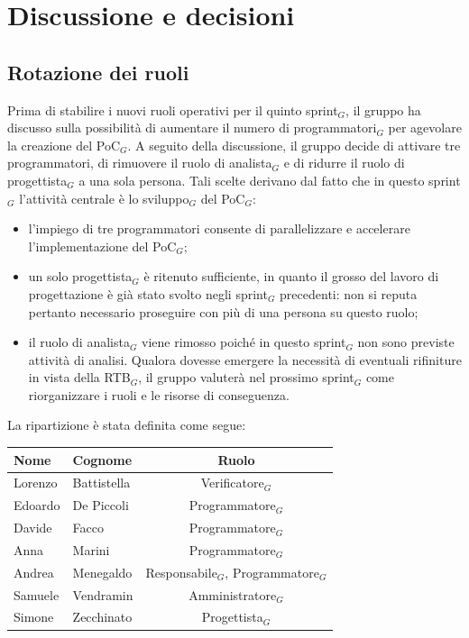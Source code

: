 \documentclass[a4paper, 10pt, colorlinks=true, linkcolor=black, urlcolor=blue, citecolor=blue, hidelinks]{article}
\begin{document}
\section{Discussione e decisioni}

\subsection{Rotazione dei ruoli}
Prima di stabilire i nuovi ruoli operativi per il quinto sprint$_G$, il gruppo ha discusso sulla possibilità di aumentare il numero di programmatori$_G$ per agevolare la creazione del PoC$_G$.
A seguito della discussione, il gruppo decide di attivare tre programmatori, di rimuovere il ruolo di analista$_G$ e di ridurre il ruolo di progettista$_G$ a una sola persona. Tali scelte derivano dal fatto che in questo sprint$_G$ l'attività centrale è lo sviluppo$_G$ del PoC$_G$:
\begin{itemize}
    \item l'impiego di tre programmatori consente di parallelizzare e accelerare l'implementazione del PoC$_G$;
    \item un solo progettista$_G$ è ritenuto sufficiente, in quanto il grosso del lavoro di progettazione è già stato svolto negli sprint$_G$ precedenti: non si reputa pertanto necessario proseguire con più di una persona su questo ruolo;
    \item il ruolo di analista$_G$ viene rimosso poiché in questo sprint$_G$ non sono previste attività di analisi. Qualora dovesse emergere la necessità di eventuali rifiniture in vista della RTB$_G$, il gruppo valuterà nel prossimo sprint$_G$ come riorganizzare i ruoli e le risorse di conseguenza.
\end{itemize}

La ripartizione è stata definita come segue:
\begin{center}
    \begin{tabular}{|l|l|c|}
        \hline
        \textbf{Nome} & \textbf{Cognome} & \textbf{Ruolo} \\
        \hline
        Lorenzo & Battistella & Verificatore$_G$ \\
        \hline
        Edoardo & De Piccoli & Programmatore$_G$ \\
        \hline
        Davide & Facco & Programmatore$_G$ \\
        \hline
        Anna & Marini & Programmatore$_G$ \\
        \hline
        Andrea & Menegaldo & Responsabile$_G$, Programmatore$_G$ \\
        \hline
        Samuele & Vendramin & Amministratore$_G$ \\
        \hline
        Simone & Zecchinato & Progettista$_G$ \\
        \hline  
    \end{tabular}
\end{center}
\end{document}
